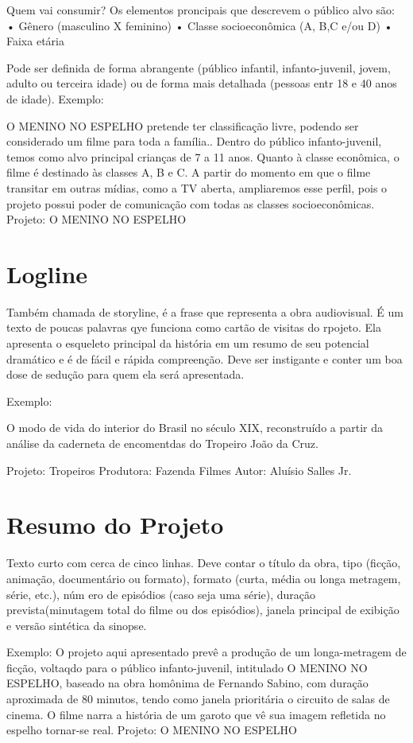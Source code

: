 Quem vai consumir?
Os elementos proncipais que descrevem o público alvo são:
    • Gênero (masculino X feminino)
    • Classe socioeconômica (A, B,C e/ou D)
    • Faixa etária

Pode ser definida de forma abrangente (público infantil, infanto-juvenil, jovem, adulto ou terceira idade) ou de forma mais detalhada (pessoas entr 18 e 40 anos de idade).
Exemplo:

O MENINO NO ESPELHO pretende ter classificação livre, podendo ser considerado um filme para toda a família.. Dentro do público infanto-juvenil, temos como alvo principal crianças de 7 a 11 anos. Quanto à classe econômica, o filme é destinado às classes A, B e C. A partir do momento em que o filme transitar em outras mídias, como a TV aberta, ampliaremos esse perfil, pois o projeto possui poder de comunicação com todas as classes socioeconômicas.
Projeto: O MENINO NO ESPELHO

\chapter{Logline}

Também chamada de storyline, é a frase que representa a obra audiovisual. É um texto de poucas palavras qye funciona como cartão de visitas do rpojeto. Ela apresenta o esqueleto principal da história em um resumo de seu potencial dramático e é de fácil e rápida compreenção. Deve ser instigante e conter um boa dose de sedução para quem ela será apresentada.

Exemplo:

O modo de vida do interior do Brasil no século XIX, reconstruído a partir da análise da caderneta de encomentdas do Tropeiro João da Cruz.

Projeto: Tropeiros
Produtora: Fazenda Filmes
Autor: Aluísio Salles Jr.

\chapter{Resumo do Projeto}

Texto curto com cerca de cinco linhas. Deve contar o título da obra, tipo (ficção, animação, documentário ou formato), formato (curta, média ou longa metragem, série, etc.), núm
ero de episódios (caso seja uma série), duração prevista(minutagem total do filme ou dos episódios), janela principal de exibição e versão sintética da sinopse.

Exemplo:
O projeto aqui apresentado prevê a produção de um longa-metragem de ficção, voltaqdo para o público infanto-juvenil, intitulado O MENINO NO ESPELHO, baseado na obra homônima de Fernando Sabino, com duração aproximada de 80 minutos, tendo como janela prioritária o circuito de salas de cinema. O filme narra a história de um garoto que vê sua imagem refletida no espelho tornar-se real.
Projeto: O MENINO NO ESPELHO

